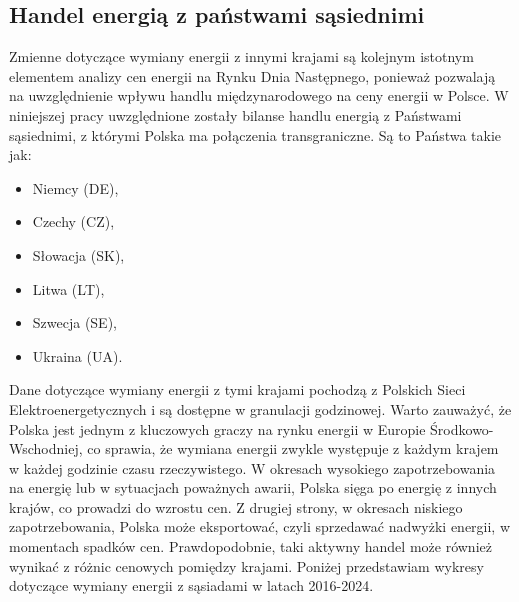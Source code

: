 \subsection{Handel energią z państwami sąsiednimi}
\label{subsec:trade}
Zmienne dotyczące wymiany energii z innymi krajami są kolejnym istotnym elementem analizy cen energii na Rynku Dnia Następnego, ponieważ pozwalają na uwzględnienie wpływu handlu międzynarodowego na ceny energii w Polsce. W niniejszej pracy uwzględnione zostały bilanse handlu energią z Państwami sąsiednimi, z którymi Polska ma połączenia transgraniczne. Są to Państwa takie jak:
\begin{itemize}
    \item Niemcy (DE),
    \item Czechy (CZ),
    \item Słowacja (SK),
    \item Litwa (LT),
    \item Szwecja (SE),
    \item Ukraina (UA).
\end{itemize}

Dane dotyczące wymiany energii z tymi krajami pochodzą z Polskich Sieci Elektroenergetycznych i są dostępne w granulacji godzinowej. Warto zauważyć, że Polska jest jednym z kluczowych graczy na rynku energii w Europie Środkowo-Wschodniej, co sprawia, że wymiana energii zwykle występuje z każdym krajem w każdej godzinie czasu rzeczywistego. W okresach wysokiego zapotrzebowania na energię lub w sytuacjach poważnych awarii, Polska sięga po energię z innych krajów, co prowadzi do wzrostu cen. Z drugiej strony, w okresach niskiego zapotrzebowania, Polska może eksportować, czyli sprzedawać nadwyżki energii, w momentach spadków cen. Prawdopodobnie, taki aktywny handel może również wynikać z różnic cenowych pomiędzy krajami. Poniżej przedstawiam wykresy dotyczące wymiany energii z sąsiadami w latach 2016-2024.

